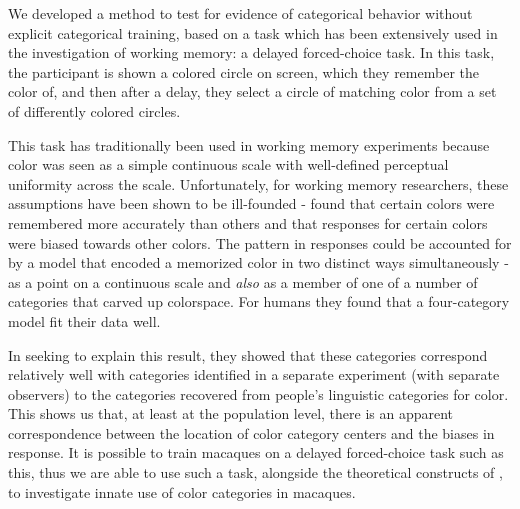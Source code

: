 
We developed a method to test for evidence of categorical behavior without explicit categorical training, based on a task which has been extensively used in the investigation of working memory: a delayed forced-choice task. %
In this task, the participant is shown a colored circle on screen, which they remember the color of, and then after a delay, they select a circle of matching color from a set of differently colored circles.

This task has traditionally been used in working memory experiments because color was seen as a simple continuous scale with well-defined perceptual uniformity across the scale. 
Unfortunately, for working memory researchers, these assumptions have been shown to be ill-founded - \cite{bae_why_2015} found that certain colors were remembered more accurately than others and that responses for certain colors were biased towards other colors.
The pattern in responses could be accounted for by a model that encoded a memorized color in two distinct ways simultaneously - as a point on a continuous scale and \emph{also} as a member of one of a number of categories that carved up colorspace. 
For humans they found that a four-category model fit their data well.

In seeking to explain this result, they showed that these categories correspond relatively well with categories identified in a separate experiment (with separate observers) to the categories recovered from people's linguistic categories for color. 
This shows us that, at least at the population level, there is an apparent correspondence between the location of color category centers and the biases in response.
It is possible to train macaques on a delayed forced-choice task such as this, thus we are able to use such a task, alongside the theoretical constructs of \cite{bae_why_2015}, to investigate innate use of color categories in macaques.


